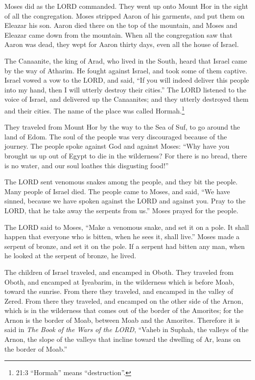 \myverse{}Moses did as the LORD commanded. They went up onto Mount Hor
in the sight of all the congregation.
\myverse{}Moses stripped Aaron of his garments, and put them on Eleazar his son. Aaron
died there on the top of the mountain, and Moses and Eleazar came down from the mountain.
\myverse{}When all the congregation saw that Aaron was dead, they wept for Aaron thirty
days, even all the house of Israel.


\mychapter{} \myverse*{}The Canaanite, the king of Arad, who lived in the South, heard
that Israel came by the way of Atharim. He fought against Israel, and took some of them captive.
\myverse{}Israel vowed a vow to the LORD, and said, “If you will indeed deliver this
people into my hand, then I will utterly destroy their cities.”
\myverse{}The LORD listened to the voice of Israel, and delivered up the Canaanites;
and they utterly destroyed them and their cities. The name of the place was called Hormah.\footnote{ 21:3 “Hormah” means “destruction”.}


\myverse{}They traveled from Mount Hor by the way to the Sea of Suf, to
go around the land of Edom. The soul of the people was very discouraged because of the journey.
\myverse{}The people spoke against God and against Moses: “Why have you brought us up
out of Egypt to die in the wilderness? For there is no bread, there is no water, and our soul loathes
this disgusting food!”


\myverse{}The LORD sent venomous snakes among the people, and they bit the
people. Many people of Israel died.
\myverse{}The people came to Moses, and said, “We have sinned, because we have spoken
against the LORD and against you. Pray to the LORD, that he take away the serpents from us.” Moses prayed
for the people.


\myverse{}The LORD said to Moses, “Make a venomous snake, and set it on
a pole. It shall happen that everyone who is bitten, when he sees it, shall live.”
\myverse{}Moses made a serpent of bronze, and set it on the pole. If a serpent had bitten
any man, when he looked at the serpent of bronze, he lived.


\myverse{}The children of Israel traveled, and encamped in Oboth.
\myverse{}They traveled from Oboth, and encamped at Iyeabarim, in the wilderness which
is before Moab, toward the sunrise.
\myverse{}From there they traveled, and encamped in the valley of Zered.
\myverse{}From there they traveled, and encamped on the other side of the Arnon, which
is in the wilderness that comes out of the border of the Amorites; for the Arnon is the border of Moab,
between Moab and the Amorites.
\myverse{}Therefore it is said in
{\textit{The Book of the Wars of the LORD}}, “Vaheb in Suphah, the valleys of the Arnon,
\myverse{}the slope of the valleys that incline toward the dwelling of Ar, leans on
the border of Moab.”


